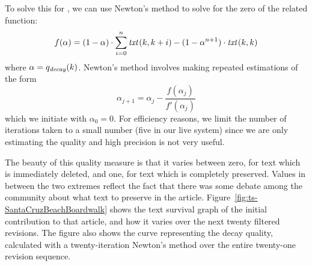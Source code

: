 To solve this for , we can use Newton's method
to solve for the zero of the related function:
\begin{equation*}
  f(\alpha) = (1 - \alpha) \cdot \sum_{i=0}^n \mathit{txt}_{}(k,k+i)
        - (1 - \alpha^{n+1}) \cdot \mathit{txt}_{}(k,k)
\end{equation*}
where $\alpha = q_\mathit{decay}(k)$.
Newton's method involves making repeated estimations of the form
\begin{equation*}
  \alpha_{j+1} = \alpha_j - \frac{f(\alpha_j)}{f'(\alpha_j)}
\end{equation*}
which we initiate with $\alpha_0 = 0$.
For efficiency reasons, we limit the number of iterations taken
to a small number (five in our live system)
since we are only estimating the quality and high precision
is not very useful.

The beauty of this quality measure is that it varies between
zero, for text which is immediately deleted, and one, for text
which is completely preserved.
Values in between the two extremes reflect the fact that there
was some debate among the community about what text to preserve
in the article.
Figure~\ref{fig:ts-SantaCruzBeachBoardwalk} shows the text survival
graph of the initial contribution to that article, and how it varies
over the next twenty filtered revisions.
The figure also shows the curve representing the decay quality,
calculated with a twenty-iteration Newton's method over the entire
twenty-one revision sequence.


